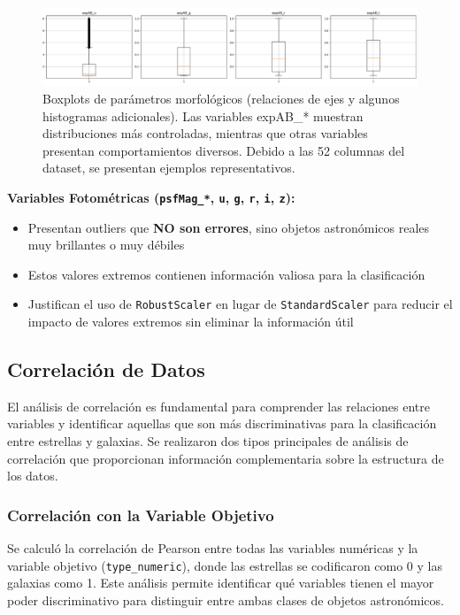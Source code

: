 \documentclass{article}
\begin{document}
\begin{figure}[H]
    \centering
    \includegraphics[width=1.0\linewidth]{boxplot_3.png}
    \caption{Boxplots de parámetros morfológicos (relaciones de ejes y algunos histogramas adicionales). Las variables expAB\_* muestran distribuciones más controladas, mientras que otras variables presentan comportamientos diversos. Debido a las 52 columnas del dataset, se presentan ejemplos representativos.}
    \label{fig:boxplot3}
\end{figure}


\textbf{Variables Fotométricas (\texttt{psfMag\_*}, \texttt{u}, \texttt{g}, \texttt{r}, \texttt{i}, \texttt{z}):}
\begin{itemize}
    \item Presentan outliers que \textbf{NO son errores}, sino objetos astronómicos reales muy brillantes o muy débiles
    \item Estos valores extremos contienen información valiosa para la clasificación
    \item Justifican el uso de \texttt{RobustScaler} en lugar de \texttt{StandardScaler} para reducir el impacto de valores extremos sin eliminar la información útil
\end{itemize}


\subsection{Correlación de Datos}

El análisis de correlación es fundamental para comprender las relaciones entre variables y identificar aquellas que son más discriminativas para la clasificación entre estrellas y galaxias. Se realizaron dos tipos principales de análisis de correlación que proporcionan información complementaria sobre la estructura de los datos.

\subsubsection{Correlación con la Variable Objetivo}

Se calculó la correlación de Pearson entre todas las variables numéricas y la variable objetivo (\texttt{type\_numeric}), donde las estrellas se codificaron como 0 y 
las galaxias como 1. Este análisis permite identificar qué variables tienen el mayor poder discriminativo para distinguir entre ambas clases de objetos astronómicos.
\end{document}
